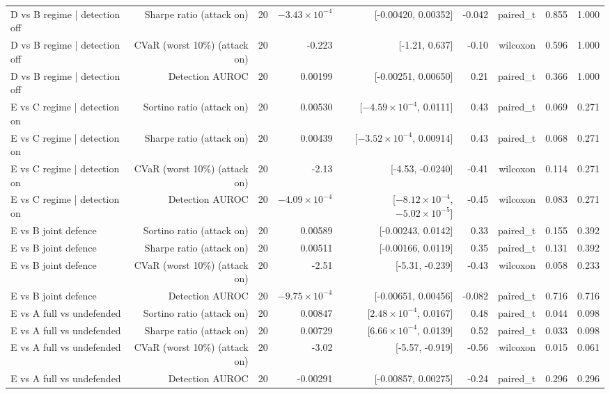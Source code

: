 \begin{table}[htbp]
\begin{tabular}{lrrrrrrrr}
    D vs B   regime | detection off & Sharpe ratio (attack on) & 20 & $-3.43\times10^{-4}$ & [-0.00420, 0.00352] & -0.042 & paired\_t & 0.855 & 1.000 \\
    D vs B   regime | detection off & CVaR (worst 10\%) (attack on) & 20 & -0.223 & [-1.21, 0.637] & -0.10 & wilcoxon & 0.596 & 1.000 \\
    D vs B   regime | detection off & Detection AUROC & 20 & 0.00199 & [-0.00251, 0.00650] & 0.21 & paired\_t & 0.366 & 1.000 \\
    E vs C   regime | detection on & Sortino ratio (attack on) & 20 & 0.00530 & [$-4.59\times10^{-4}$, 0.0111] & 0.43 & paired\_t & 0.069 & 0.271 \\
    E vs C   regime | detection on & Sharpe ratio (attack on) & 20 & 0.00439 & [$-3.52\times10^{-4}$, 0.00914] & 0.43 & paired\_t & 0.068 & 0.271 \\
    E vs C   regime | detection on & CVaR (worst 10\%) (attack on) & 20 & -2.13 & [-4.53, -0.0240] & -0.41 & wilcoxon & 0.114 & 0.271 \\
    E vs C   regime | detection on & Detection AUROC & 20 & $-4.09\times10^{-4}$ & [$-8.12\times10^{-4}$, $-5.02\times10^{-5}$] & -0.45 & wilcoxon & 0.083 & 0.271 \\
    E vs B   joint defence & Sortino ratio (attack on) & 20 & 0.00589 & [-0.00243, 0.0142] & 0.33 & paired\_t & 0.155 & 0.392 \\
    E vs B   joint defence & Sharpe ratio (attack on) & 20 & 0.00511 & [-0.00166, 0.0119] & 0.35 & paired\_t & 0.131 & 0.392 \\
    E vs B   joint defence & CVaR (worst 10\%) (attack on) & 20 & -2.51 & [-5.31, -0.239] & -0.43 & wilcoxon & 0.058 & 0.233 \\
    E vs B   joint defence & Detection AUROC & 20 & $-9.75\times10^{-4}$ & [-0.00651, 0.00456] & -0.082 & paired\_t & 0.716 & 0.716 \\
    E vs A   full vs undefended & Sortino ratio (attack on) & 20 & 0.00847 & [$2.48\times10^{-4}$, 0.0167] & 0.48 & paired\_t & 0.044 & 0.098 \\
    E vs A   full vs undefended & Sharpe ratio (attack on) & 20 & 0.00729 & [$6.66\times10^{-4}$, 0.0139] & 0.52 & paired\_t & 0.033 & 0.098 \\
    E vs A   full vs undefended & CVaR (worst 10\%) (attack on) & 20 & -3.02 & [-5.57, -0.919] & -0.56 & wilcoxon & 0.015 & 0.061 \\
    E vs A   full vs undefended & Detection AUROC & 20 & -0.00291 & [-0.00857, 0.00275] & -0.24 & paired\_t & 0.296 & 0.296 \\

\end{tabular}
\end{table}
